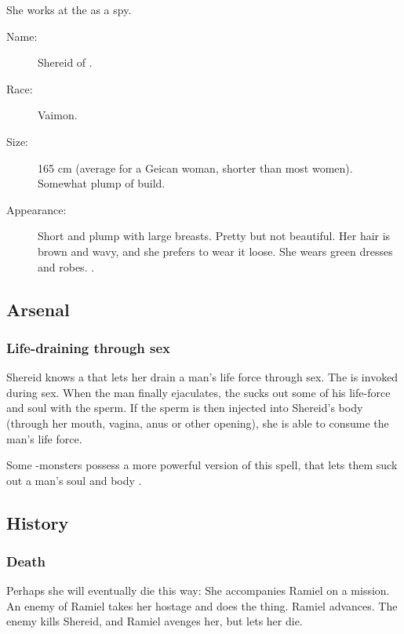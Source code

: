 She works at the \TopazChateau{} as a spy. 



\begin{description}
  \item[Name:] {Shereid} \Kazzed{} of \ClanGeican. 
  \item[Race:] Vaimon. 
  \item[Size:] 
    165 cm (average for a Geican woman, shorter than most \human{} women). Somewhat plump of build. 
  \item[Appearance:] 
    Short and plump with large breasts. Pretty but not beautiful. Her hair is brown and wavy, and she prefers to wear it loose. She wears green dresses and robes. 
    . 
\end{description}









\subsection{Arsenal}
\subsubsection{Life-draining through sex}
Shereid knows a \Qliphah{} that lets her drain a man's life force through sex. The \Qliphah{} is invoked during sex. When the man finally ejaculates, the \Qliphah{} sucks out some of his life-force and soul with the sperm. If the sperm is then injected into Shereid's body (through her mouth, vagina, anus or other opening), she is able to consume the man's life force.

\index{\succubus}%
Some -monsters possess a more powerful version of this spell, that lets them suck out a man's soul and body . 









\subsection{History}
\subsubsection{Death}
Perhaps she will eventually die this way: She accompanies Ramiel on a mission. An enemy of Ramiel takes her hostage and does the  thing. Ramiel advances. The enemy kills Shereid, and Ramiel avenges her, but lets her die. 

